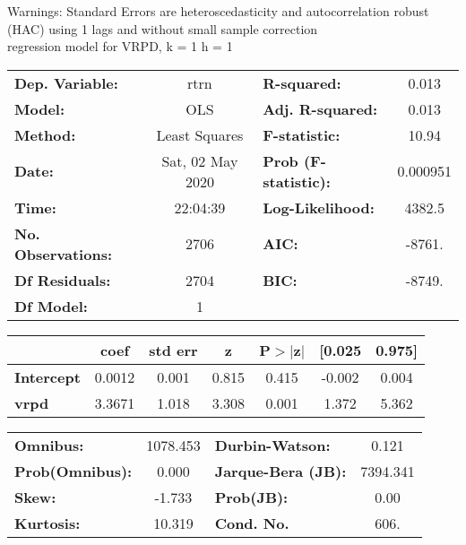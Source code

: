 Warnings: \newline
 [1] Standard Errors are heteroscedasticity and autocorrelation robust (HAC) using 1 lags and without small sample correction\\ 

regression model for VRPD, k = 1 h = 1\begin{center}
\begin{tabular}{lclc}
\toprule
\textbf{Dep. Variable:}    &       rtrn       & \textbf{  R-squared:         } &     0.013   \\
\textbf{Model:}            &       OLS        & \textbf{  Adj. R-squared:    } &     0.013   \\
\textbf{Method:}           &  Least Squares   & \textbf{  F-statistic:       } &     10.94   \\
\textbf{Date:}             & Sat, 02 May 2020 & \textbf{  Prob (F-statistic):} &  0.000951   \\
\textbf{Time:}             &     22:04:39     & \textbf{  Log-Likelihood:    } &    4382.5   \\
\textbf{No. Observations:} &        2706      & \textbf{  AIC:               } &    -8761.   \\
\textbf{Df Residuals:}     &        2704      & \textbf{  BIC:               } &    -8749.   \\
\textbf{Df Model:}         &           1      & \textbf{                     } &             \\
\bottomrule
\end{tabular}
\begin{tabular}{lcccccc}
                   & \textbf{coef} & \textbf{std err} & \textbf{z} & \textbf{P$> |$z$|$} & \textbf{[0.025} & \textbf{0.975]}  \\
\midrule
\textbf{Intercept} &       0.0012  &        0.001     &     0.815  &         0.415        &       -0.002    &        0.004     \\
\textbf{vrpd}      &       3.3671  &        1.018     &     3.308  &         0.001        &        1.372    &        5.362     \\
\bottomrule
\end{tabular}
\begin{tabular}{lclc}
\textbf{Omnibus:}       & 1078.453 & \textbf{  Durbin-Watson:     } &    0.121  \\
\textbf{Prob(Omnibus):} &   0.000  & \textbf{  Jarque-Bera (JB):  } & 7394.341  \\
\textbf{Skew:}          &  -1.733  & \textbf{  Prob(JB):          } &     0.00  \\
\textbf{Kurtosis:}      &  10.319  & \textbf{  Cond. No.          } &     606.  \\
\bottomrule
\end{tabular}
\end{center}

